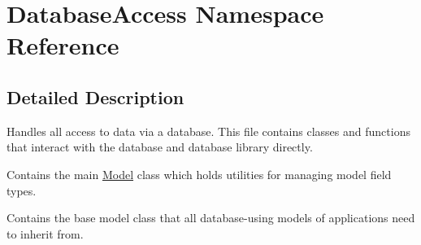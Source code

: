\hypertarget{namespaceDatabaseAccess}{\section{Database\-Access Namespace Reference}
\label{namespaceDatabaseAccess}
}


\subsection{Detailed Description}
Handles all access to data via a database. This file contains classes and functions that interact with the database and database library directly.

Contains the main \hyperlink{classModel}{Model} class which holds utilities for managing model field types.

Contains the base model class that all database-\/using models of applications need to inherit from. 